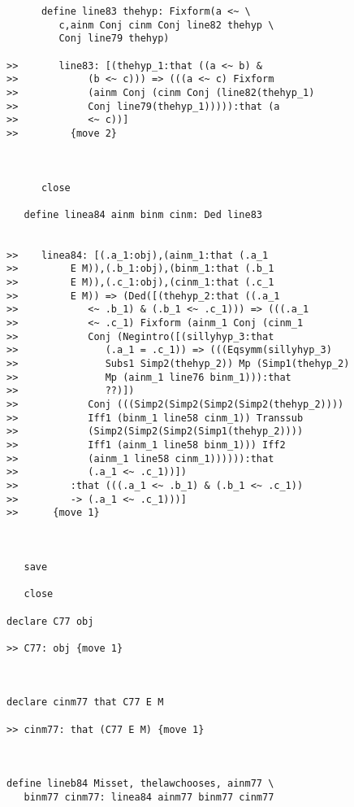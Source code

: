 \documentclass[12pt]{article}
\begin{document}
\begin{verbatim}
      define line83 thehyp: Fixform(a <~ \
         c,ainm Conj cinm Conj line82 thehyp \
         Conj line79 thehyp)

>>       line83: [(thehyp_1:that ((a <~ b) &
>>            (b <~ c))) => (((a <~ c) Fixform
>>            (ainm Conj (cinm Conj (line82(thehyp_1)
>>            Conj line79(thehyp_1))))):that (a
>>            <~ c))]
>>         {move 2}



      close

   define linea84 ainm binm cinm: Ded line83


>>    linea84: [(.a_1:obj),(ainm_1:that (.a_1
>>         E M)),(.b_1:obj),(binm_1:that (.b_1
>>         E M)),(.c_1:obj),(cinm_1:that (.c_1
>>         E M)) => (Ded([(thehyp_2:that ((.a_1
>>            <~ .b_1) & (.b_1 <~ .c_1))) => (((.a_1
>>            <~ .c_1) Fixform (ainm_1 Conj (cinm_1
>>            Conj (Negintro([(sillyhyp_3:that
>>               (.a_1 = .c_1)) => (((Eqsymm(sillyhyp_3)
>>               Subs1 Simp2(thehyp_2)) Mp (Simp1(thehyp_2)
>>               Mp (ainm_1 line76 binm_1))):that
>>               ??)])
>>            Conj (((Simp2(Simp2(Simp2(Simp2(thehyp_2))))
>>            Iff1 (binm_1 line58 cinm_1)) Transsub
>>            (Simp2(Simp2(Simp2(Simp1(thehyp_2))))
>>            Iff1 (ainm_1 line58 binm_1))) Iff2
>>            (ainm_1 line58 cinm_1)))))):that
>>            (.a_1 <~ .c_1))])
>>         :that (((.a_1 <~ .b_1) & (.b_1 <~ .c_1))
>>         -> (.a_1 <~ .c_1)))]
>>      {move 1}



   save

   close

declare C77 obj

>> C77: obj {move 1}



declare cinm77 that C77 E M

>> cinm77: that (C77 E M) {move 1}



define lineb84 Misset, thelawchooses, ainm77 \
   binm77 cinm77: linea84 ainm77 binm77 cinm77



\end{verbatim}
\end{document}
